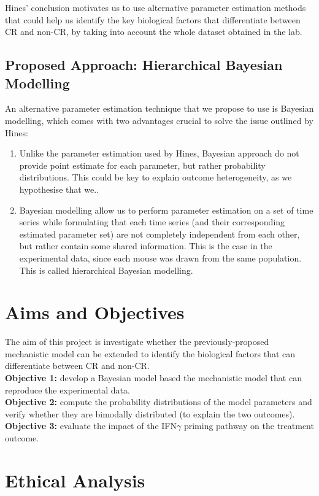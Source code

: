 \documentclass[11pt]{article}
\begin{document}
Hines' conclusion motivates us to use alternative parameter estimation methods that could help us identify the key biological factors that differentiate between CR and non-CR, by taking into account the whole dataset obtained in the lab.

\subsection{Proposed Approach: Hierarchical Bayesian Modelling}

An alternative parameter estimation technique that we propose to use is Bayesian modelling, which comes with two advantages crucial to solve the issue outlined by Hines:
\begin{enumerate}
    \item Unlike the parameter estimation used by Hines, Bayesian approach do not provide point estimate for each parameter, but rather probability distributions. This could be key to explain outcome heterogeneity, as we hypothesise that we..
    \item Bayesian modelling allow us to perform parameter estimation on a set of time series while formulating that each time series (and their corresponding estimated parameter set) are not completely independent from each other, but rather contain some shared information. This is the case in the experimental data, since each mouse was drawn from the same population. This is called hierarchical Bayesian modelling.
\end{enumerate}

\section{Aims and Objectives}
\noindent The aim of this project is investigate whether the previously-proposed mechanistic model can be extended to identify the biological factors that can differentiate between CR and non-CR.\\[8pt]
\textbf{Objective 1:} develop a Bayesian model based the mechanistic model that can reproduce the experimental data.\\ 
\textbf{Objective 2:} compute the probability distributions of the model parameters and verify whether they are bimodally distributed (to explain the two outcomes).\\ 
\textbf{Objective 3:} evaluate the impact of the IFN$\gamma$ priming pathway on the treatment outcome. 

\section{Ethical Analysis}
\end{document}
